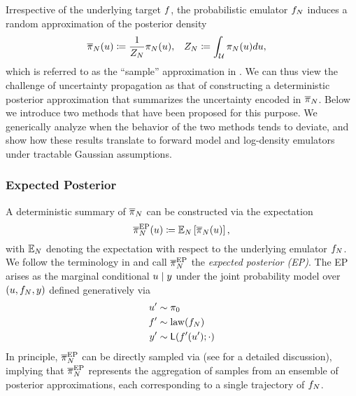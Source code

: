 \documentclass[12pt]{article}
\begin{document}
Irrespective of the underlying target $f$, the probabilistic emulator $f_{N}$ 
induces a random approximation of the posterior density
\begin{align}
\overline{\pi}_{N}(u) &\coloneqq \frac{1}{Z_{N}} \pi_{N}(u),
&&Z_{N} \coloneqq \int_{\mathcal{U}} \pi_{N}(u) du, \label{eq:random-post}
\end{align}
which is referred to as the ``sample'' approximation in \citet{StuartTeck1}. We can thus
view the challenge of uncertainty propagation as that of constructing a deterministic 
posterior approximation that summarizes the uncertainty encoded in $\overline{\pi}_{N}$.
Below we introduce two methods that have been proposed for this purpose. We generically
analyze when the behavior of the two methods tends to deviate, and show how these 
results translate to forward model and log-density emulators under tractable 
Gaussian assumptions.

\subsubsection{Expected Posterior}
A deterministic summary of $\overline{\pi}_{N}$ can be constructed via the expectation 
\begin{equation}
\overline{\pi}_{N}^{\mathrm{EP}}(u) \coloneqq \mathbb{E}_{N}\left[\overline{\pi}_{N}(u) \right], \label{eq:ep-approx}
\end{equation}
with $\mathbb{E}_{N}$ denoting the expectation with respect to the underlying emulator $f_{N}$.
We follow the terminology in \citet{BurknerSurrogate} and call $\overline{\pi}_{N}^{\mathrm{EP}}$ the 
\textit{expected posterior (EP)}. The EP arises as the marginal conditional $u \mid y$ under 
the joint probability model over $(u, f_{N}, y)$ defined generatively via
\begin{align}
u^\prime &\sim \pi_0 \label{eq:ep-prob-model} \\
f^\prime &\sim \mathrm{law}(f_{N}) \nonumber \\
y^\prime &\sim \mathsf{L}(f^\prime(u^\prime); \cdot) \nonumber
\end{align}
In principle, $\overline{\pi}_{N}^{\mathrm{EP}}$ can be directly sampled via  (see 
for a detailed discussion), implying that $\overline{\pi}_{N}^{\mathrm{EP}}$ represents the aggregation of samples 
from an ensemble of posterior approximations, each corresponding to a single trajectory of $f_{N}$.
\end{document}
